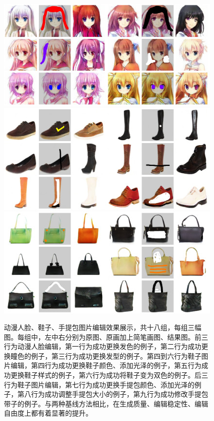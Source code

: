 \documentclass[a4paper,12pt,UTF8]{ctexart}
\newcommand{\kai}{\CJKfamily{zhkai}}	%
\begin{document}
\begin{figure}[H]
  \centering
  \includegraphics[width=0.9\linewidth]{figs/pic.png}
  \includegraphics[width=0.9\linewidth]{figs/shoes.png}
  \includegraphics[width=0.9\linewidth]{figs/handbags.png}
  \caption{\kai 动漫人脸、鞋子、手提包图片编辑效果展示，共十八组，每组三幅图。每组中，左中右分别为原图、原画加上简笔画图、结果图。前三行为动漫人脸编辑，第一行为成功更换发色的例子，第二行为成功更换瞳色的例子，第三行为成功更换发型的例子。第四到六行为鞋子图片编辑，第四行为成功更换鞋子颜色、添加光泽的例子，第五行为成功更换鞋子样式的例子，第六行为成功将鞋子变为双色的例子。后三行为鞋子图片编辑，第七行为成功更换手提包颜色、添加光泽的例子，第八行为成功调整手提包大小的例子，第九行为成功修改手提包带子的例子。与两种基线方法相比，在生成质量、编辑稳定性、编辑自由度上都有着显著的提升。}
  \label{fig:pic}
\end{figure}
\end{document}
